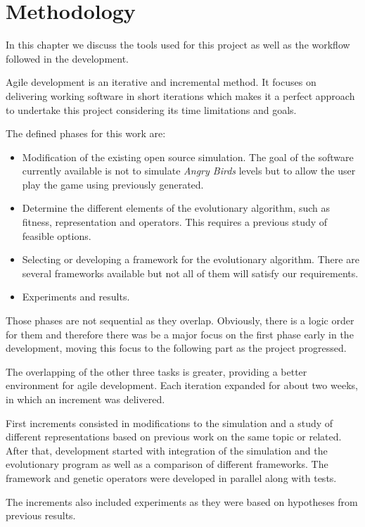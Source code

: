\chapter{Methodology}\label{ch:workflow}

In this chapter we discuss the tools used for this project as well as the workflow followed in the development. 

Agile development is an iterative and incremental method. It focuses on delivering working software in short iterations which makes it a perfect approach to undertake this project considering its time limitations and goals.

The defined phases for this work are:
\begin{itemize}
	\item Modification of the existing open source simulation. The goal of the software currently available is not to simulate \textit{Angry Birds} levels but to allow the user play the game using previously generated. 
	\item Determine the different elements of the evolutionary algorithm, such as fitness, representation and operators. This requires a previous study of feasible options. 
	\item Selecting or developing a framework for the evolutionary algorithm. There are several frameworks available but not all of them will satisfy our requirements. 
	\item Experiments and results.
\end{itemize}

Those phases are not sequential as they overlap. Obviously, there is a logic order for them and therefore there was be a major focus on the first phase early in the development, moving this focus to the following part as the project progressed. 

The overlapping of the other three tasks is greater, providing a better environment for agile development. Each iteration expanded for about two weeks, in  which an increment was delivered. 

First increments consisted in modifications to the simulation and a study of different representations based on previous work on the same topic or related. After that, development started with integration of the simulation and the evolutionary program as well as a comparison of different frameworks. The framework and genetic operators were developed in parallel along with tests.

The increments also included experiments as they were based on hypotheses from previous results. 


